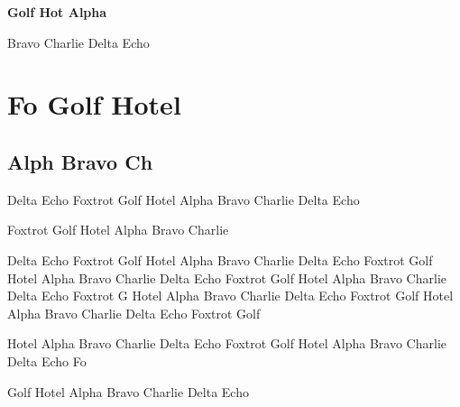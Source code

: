 \documentclass[11pt,a4paper]{article}
\begin{document}
\textbf{Golf Hot			Alpha}

Bravo Charlie Delta Echo

\section{Fo	Golf Hotel}

\subsection{Alph	Bravo Ch}

Delta Echo Foxtrot Golf Hotel Alpha Bravo Charlie Delta Echo

Foxtrot Golf Hotel Alpha Bravo Charlie

Delta Echo Foxtrot Golf Hotel Alpha Bravo Charlie Delta Echo Foxtrot Golf Hotel Alpha Bravo Charlie Delta Echo Foxtrot Golf Hotel Alpha Bravo Charlie Delta Echo Foxtrot G
Hotel Alpha Bravo Charlie Delta Echo Foxtrot Golf Hotel Alpha Bravo Charlie Delta Echo Foxtrot Golf

Hotel Alpha Bravo Charlie Delta Echo Foxtrot Golf Hotel Alpha Bravo Charlie Delta Echo Fo

Golf Hotel Alpha Bravo Charlie Delta Echo
\end{document}
